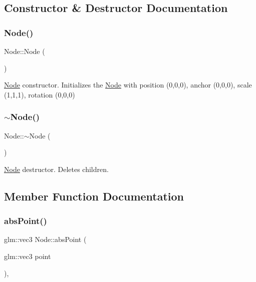 \subsection{Constructor \& Destructor Documentation}
\mbox{\label{classsage_1_1Node_ad7a34779cad45d997bfd6d3d8043c75f}} 
\subsubsection{\texorpdfstring{Node()}{Node()}}
{\footnotesize\ttfamily Node\+::\+Node (\begin{DoxyParamCaption}{ }\end{DoxyParamCaption})}



\mbox{\hyperlink{classsage_1_1Node}{Node}} constructor. Initializes the \mbox{\hyperlink{classsage_1_1Node}{Node}} with position (0,0,0), anchor (0,0,0), scale (1,1,1), rotation (0,0,0) 

\mbox{\label{classsage_1_1Node_aa0840c3cb5c7159be6d992adecd2097c}} 
\subsubsection{\texorpdfstring{$\sim$Node()}{~Node()}}
{\footnotesize\ttfamily Node\+::$\sim$\+Node (\begin{DoxyParamCaption}{ }\end{DoxyParamCaption})\hspace{0.3cm}{\ttfamily [virtual]}}



\mbox{\hyperlink{classsage_1_1Node}{Node}} destructor. Deletes children. 



\subsection{Member Function Documentation}
\mbox{\label{classsage_1_1Node_a708c034b5b9d316265309a3a46811a06}} 
\subsubsection{\texorpdfstring{absPoint()}{absPoint()}}
{\footnotesize\ttfamily glm\+::vec3 Node\+::abs\+Point (\begin{DoxyParamCaption}\item[{glm\+::vec3}]{point }\end{DoxyParamCaption})\hspace{0.3cm}{\ttfamily [protected]}, {\ttfamily [virtual]}}



